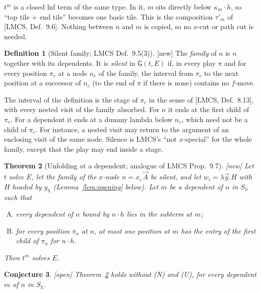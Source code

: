 \documentclass[11pt]{article}
\newcommand{\Gm}{\mathsf{G}}
\newcommand{\suc}[2]{#1{\cdot}#2}
\newcommand{\New}{\textsf{[new]}}
\newcommand{\Open}{\textsf{\color{red!60!black}[open]}}
\theoremstyle{plain}
\newtheorem{theorem}{Theorem}[section]
\newtheorem{conjecture}[theorem]{Conjecture}
\theoremstyle{definition}
\newtheorem{definition}[theorem]{Definition}
\theoremstyle{remark}
\begin{document}
$t^m$ is a closed lnf term of the same type.  In it, $m$ sits directly
below $\suc{\kappa_m}h$, so ``top tile $+$ end tile'' becomes one basic
tile.  This is the composition $\tau'_m$ of [LMCS, Def.~9.6].  Nothing
between $n$ and $m$ is copied, so no $x$-cut or path cut is needed.

\begin{definition}[Silent family; LMCS Def.~9.5(3)]\label{def:silentfam}
\New{} The \emph{family} of $n$ is $n$ together with its dependents.  It
is \emph{silent} in $\Gm(t,E)$ if, in every play $\pi$ and for every
position $\pi_c$ at a node $n_c$ of the family, the interval from
$\pi_c$ to the next position at a successor of $n_c$ (to the end of
$\pi$ if there is none) contains no $f$-move.
\end{definition}

The interval of the definition is the stage of $\pi_c$ in the sense of
[LMCS, Def.~8.13], with every nested visit of the family absorbed.  For
$n$ it ends at the first child of $\pi_c$.  For a dependent it ends at a
dummy lambda below $n_c$, which need not be a child of $\pi_c$.  For
instance, a nested visit may return to the argument of an enclosing
visit of the same node.  Silence is LMCS's ``not $x$-special'' for the
whole family, except that the play may end inside a stage.

\begin{theorem}[Unfolding at a dependent; analogue of LMCS Prop.~9.7]\label{thm:lmcsunf}
\New{} Let $t$ solve $E$, let the family of the $x$-node
$n=x_i\,\vec A$ be silent, and let $w_i=\lambda\vec y.H$ with $H$
headed by $y_{h}$ (Lemma~\ref{lem:opening} below).  Let $m$ be a
dependent of $n$ in $S_h$ such that
\begin{enumerate}[(N)]
\item every dependent of $n$ bound by $\suc nh$ lies in the subterm at
  $m$;
\item[(U)] for every position $\pi_a$ at $n$, at most one position at $m$
  has the entry of the first child of $\pi_a$ for $\suc nh$.
\end{enumerate}
Then $t^m$ solves $E$.
\end{theorem}

\begin{conjecture}\label{conj:lmcsunf}
\Open{} Theorem~\ref{thm:lmcsunf} holds without (N) and (U), for every
dependent $m$ of $n$ in $S_h$.
\end{conjecture}
\end{document}
